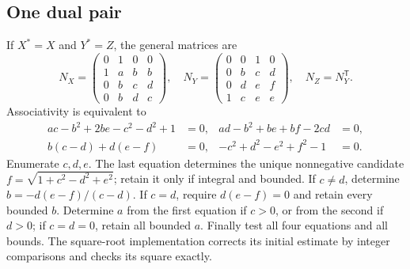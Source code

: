 \subsection{One dual pair}
If $X^*=X$ and $Y^*=Z$, the general matrices are
\[
N_X=\begin{pmatrix}0&1&0&0\\1&a&b&b\\0&b&c&d\\0&b&d&c\end{pmatrix},\quad
N_Y=\begin{pmatrix}0&0&1&0\\0&b&c&d\\0&d&e&f\\1&c&e&e\end{pmatrix},\quad
N_Z=N_Y^{\mathsf T}.
\]
Associativity is equivalent to
\begin{align*}
 ac-b^2+2be-c^2-d^2+1&=0,&ad-b^2+be+bf-2cd&=0,\\
 b(c-d)+d(e-f)&=0,&-c^2+d^2-e^2+f^2-1&=0.
\end{align*}
Enumerate $c,d,e$. The last equation determines the unique nonnegative
candidate $f=\sqrt{1+c^2-d^2+e^2}$; retain it only if integral and
bounded. If $c\ne d$, determine $b=-d(e-f)/(c-d)$. If $c=d$, require
$d(e-f)=0$ and retain every bounded $b$. Determine $a$ from the first
equation if $c>0$, or from the second if $d>0$; if $c=d=0$, retain
all bounded $a$. Finally test all four equations and all bounds.
The square-root implementation corrects its initial estimate by integer
comparisons and checks its square exactly.

